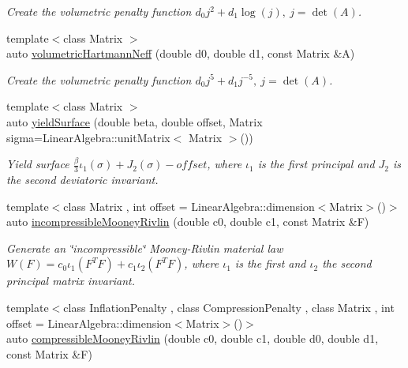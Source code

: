 \begin{DoxyCompactItemize}
\begin{DoxyCompactList}\small\item\em Create the volumetric penalty function $ d_0 j^2 + d_1 \log(j),\ j=\det(A) $. \end{DoxyCompactList}\item 
\hypertarget{namespaceRFFGen_a18b1b3749e9292f521920a9cded87ca7}{{\footnotesize template$<$class Matrix $>$ }\\auto \hyperlink{namespaceRFFGen_a18b1b3749e9292f521920a9cded87ca7}{volumetric\-Hartmann\-Neff} (double d0, double d1, const Matrix \&A)}\label{namespaceRFFGen_a18b1b3749e9292f521920a9cded87ca7}

\begin{DoxyCompactList}\small\item\em Create the volumetric penalty function $ d_0 j^5 + d_1 j^{-5},\ j=\det(A) $. \end{DoxyCompactList}\item 
\hypertarget{namespaceRFFGen_aa17be470f8d1f282f788fa1b844ad3bb}{{\footnotesize template$<$class Matrix $>$ }\\auto \hyperlink{namespaceRFFGen_aa17be470f8d1f282f788fa1b844ad3bb}{yield\-Surface} (double beta, double offset, Matrix sigma=Linear\-Algebra\-::unit\-Matrix$<$ Matrix $>$())}\label{namespaceRFFGen_aa17be470f8d1f282f788fa1b844ad3bb}

\begin{DoxyCompactList}\small\item\em Yield surface $ \frac{\beta}{3}\iota_1(\sigma) + J_2(\sigma)-offset $, where $\iota_1$ is the first principal and $J_2$ is the second deviatoric invariant. \end{DoxyCompactList}\item 
\hypertarget{group__Rubber_ga8626dcc0c5d11d3d2d796d09457e5e5d}{{\footnotesize template$<$class Matrix , int offset = Linear\-Algebra\-::dimension$<$\-Matrix$>$()$>$ }\\auto \hyperlink{group__Rubber_ga8626dcc0c5d11d3d2d796d09457e5e5d}{incompressible\-Mooney\-Rivlin} (double c0, double c1, const Matrix \&F)}\label{group__Rubber_ga8626dcc0c5d11d3d2d796d09457e5e5d}

\begin{DoxyCompactList}\small\item\em Generate an \char`\"{}incompressible\char`\"{} Mooney-\/\-Rivlin material law $ W(F)=c_0\iota_1(F^T F) + c_1\iota_2(F^T F) $, where $\iota_1$ is the first and $\iota_2$ the second principal matrix invariant. \end{DoxyCompactList}\item 
\hypertarget{group__Rubber_ga1522c73c1e2eec5516b73b203150c7e1}{{\footnotesize template$<$class Inflation\-Penalty , class Compression\-Penalty , class Matrix , int offset = Linear\-Algebra\-::dimension$<$\-Matrix$>$()$>$ }\\auto \hyperlink{group__Rubber_ga1522c73c1e2eec5516b73b203150c7e1}{compressible\-Mooney\-Rivlin} (double c0, double c1, double d0, double d1, const Matrix \&F)}\label{group__Rubber_ga1522c73c1e2eec5516b73b203150c7e1}


\end{DoxyCompactItemize}
